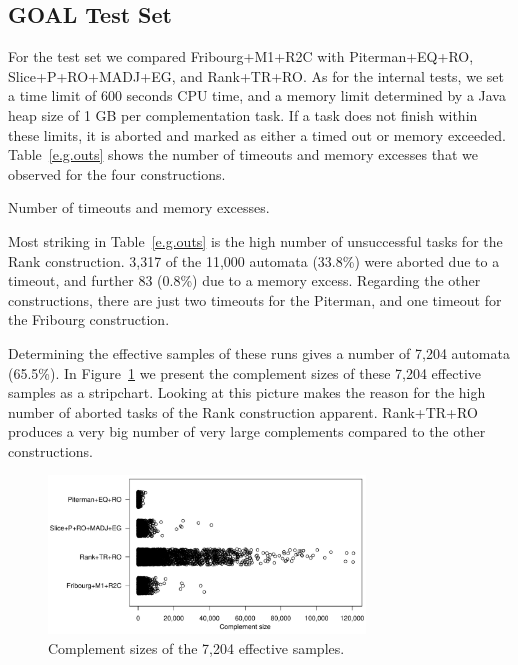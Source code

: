 \subsection{GOAL Test Set}
\label{5_external_goal}
For the \goal{} test set we compared Fribourg+M1+R2C with Piterman+EQ+RO, Slice+P+RO+MADJ+EG, and Rank+TR+RO. As for the internal tests, we set a time limit of 600 seconds CPU time, and a memory limit determined by a Java heap size of 1 GB per complementation task. If a task does not finish within these limits, it is aborted and marked as either a timed out or memory exceeded. Table~\ref{e.g.outs} shows the number of timeouts and memory excesses that we observed for the four constructions.


\begin{table}[ht]
\centering

\caption{Number of timeouts and memory excesses.}
\label{e.g.outs}
\end{table}

Most striking in Table~\ref{e.g.outs} is the high number of unsuccessful tasks for the Rank construction. 3,317 of the 11,000 automata (33.8\%) were aborted due to a timeout, and further 83 (0.8\%) due to a memory excess. Regarding the other constructions, there are just two timeouts for the Piterman, and one timeout for the Fribourg construction.

Determining the effective samples of these runs gives a number of 7,204 automata (65.5\%). In Figure~\ref{e.g.stripchart.with_rank} we present the complement sizes of these 7,204 effective samples as a stripchart. Looking at this picture makes the reason for the high number of aborted tasks of the Rank construction apparent. Rank+TR+RO produces a very big number of very large complements compared to the other constructions. 

\begin{figure}[ht]
\centering
\includegraphics[width=0.75\textwidth]{figures/r/external/goal/s.stripchart.with_rank.pdf}
\caption{Complement sizes of the 7,204 effective samples.}
\label{e.g.stripchart.with_rank}
\end{figure}

